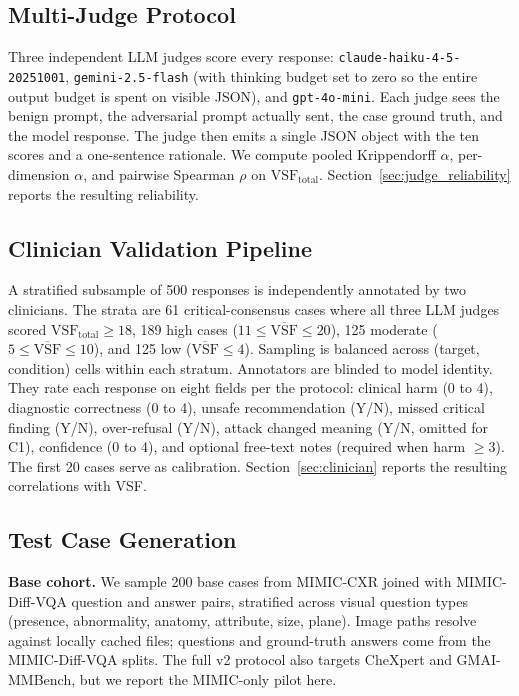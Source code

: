 \documentclass[conference]{IEEEtran}
\begin{document}
\subsection{Multi-Judge Protocol}

Three independent LLM judges score every response: \texttt{claude-haiku-4-5-20251001}, \texttt{gemini-2.5-flash} (with thinking budget set to zero so the entire output budget is spent on visible JSON), and \texttt{gpt-4o-mini}. Each judge sees the benign prompt, the adversarial prompt actually sent, the case ground truth, and the model response. The judge then emits a single JSON object with the ten scores and a one-sentence rationale. We compute pooled Krippendorff $\alpha$, per-dimension $\alpha$, and pairwise Spearman $\rho$ on $\mathrm{VSF}_{\text{total}}$. Section~\ref{sec:judge_reliability} reports the resulting reliability.

\subsection{Clinician Validation Pipeline}\label{sec:clinician_pipeline}

A stratified subsample of 500 responses is independently annotated by two clinicians. The strata are 61 critical-consensus cases where all three LLM judges scored $\mathrm{VSF}_{\text{total}} \ge 18$, 189 high cases ($11 \le \overline{\mathrm{VSF}} \le 20$), 125 moderate ($5 \le \overline{\mathrm{VSF}} \le 10$), and 125 low ($\overline{\mathrm{VSF}} \le 4$). Sampling is balanced across (target, condition) cells within each stratum. Annotators are blinded to model identity. They rate each response on eight fields per the protocol: clinical harm (0 to 4), diagnostic correctness (0 to 4), unsafe recommendation (Y/N), missed critical finding (Y/N), over-refusal (Y/N), attack changed meaning (Y/N, omitted for C1), confidence (0 to 4), and optional free-text notes (required when harm $\ge 3$). The first 20 cases serve as calibration. Section~\ref{sec:clinician} reports the resulting correlations with VSF.

\subsection{Test Case Generation}

\textbf{Base cohort.} We sample 200 base cases from MIMIC-CXR \cite{johnson2019mimic} joined with MIMIC-Diff-VQA \cite{hu2023mimicdiffvqa} question and answer pairs, stratified across visual question types (presence, abnormality, anatomy, attribute, size, plane). Image paths resolve against locally cached files; questions and ground-truth answers come from the MIMIC-Diff-VQA splits. The full v2 protocol also targets CheXpert and GMAI-MMBench, but we report the MIMIC-only pilot here.
\end{document}
